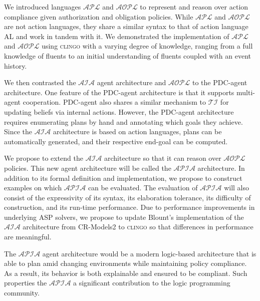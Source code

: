 We introduced languages $\mathcal{APL}$ and $\mathcal{AOPL}$ to represent and reason over action compliance given authorization and obligation policies.
While $\mathcal{APL}$ and $\mathcal{AOPL}$ are not action languages, they share a similar syntax to that of action language AL and work in tandem with it.
We demonstrated the implementation of $\mathcal{APL}$ and $\mathcal{AOPL}$ using \textsc{clingo} with a varying degree of knowledge, ranging from a full knowledge of fluents to an initial understanding of fluents coupled with an event history.

We then contrasted the $\mathcal{AIA}$ agent architecture and $\mathcal{AOPL}$ to the PDC-agent architecture.
One feature of the PDC-agent architecture is that it supports multi-agent cooperation.
PDC-agent also shares a similar mechanism to $\mathcal{TI}$ for updating beliefs via internal actions.
However, the PDC-agent architecture requires enumerating plans by hand and annotating which goals they achieve.
Since the $\mathcal{AIA}$ architecture is based on action languages, plans can be automatically generated, and their respective end-goal can be computed.

We propose to extend the $\mathcal{AIA}$ architecture so that it can reason over $\mathcal{AOPL}$ policies.
This new agent architecture will be called the $\mathcal{APIA}$ architecture.
In addition to its formal definition and implementation, we propose to construct examples on which $\mathcal{APIA}$ can be evaluated.
The evaluation of $\mathcal{APIA}$ will also consist of the expressivity of its syntax, its elaboration tolerance, its difficulty of construction, and its run-time performance.
Due to performance improvements in underlying ASP solvers, we propose to update Blount's implementation of the $\mathcal{AIA}$ architecture from CR-Models2 to \textsc{clingo} so that differences in performance are meaningful.

The $\mathcal{APIA}$ agent architecture would be a modern logic-based architecture that is able to plan amid changing environments while maintaining policy compliance.
As a result, its behavior is both explainable and ensured to be compliant.
Such properties the $\mathcal{APIA}$ a significant contribution to the logic programming community.
